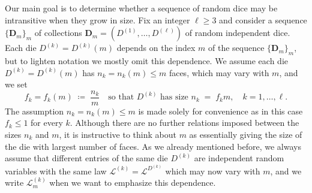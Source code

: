 \documentclass[reqno,a4paper,11pt]{amsart}
\theoremstyle{remark}
\newcommand{\mc}[1]{{\mathcal #1}}
\newcommand{\mb}[1]{{\mathbf #1}}
\numberwithin{equation}{section}
\begin{document}
Our main goal is to determine whether a sequence of random dice may be intransitive when they grow in size. Fix an integer $\ell\geq 3$ and consider a sequence $\{\mb D_m\}_m$ of collections $\mb D_m=(D^{(1)},\hdots, D^{(\ell)})$ of random independent dice. Each die $D^{(k)}=D^{(k)}(m)$ depends on the index $m$ of the sequence $\{\mb D_m\}_m$, but to lighten notation we mostly omit this dependence. We assume each die $D^{(k)}=D^{(k)}(m)$ has $n_k=n_k(m)\leq m$ faces, which may vary with $m$, and we set
%
\begin{equation}\label{deff:fkm}
f_k=f_k(m)\;\coloneqq\;\frac{n_k}{m}\quad \text{so that } D^{(k)} \text{ has size } n_k\;=\;f_km,\quad k=1,\hdots, \ell.
\end{equation}
%
The assumption $n_k=n_k(m)\leq m$ is made solely for convenience as in this case $f_k\leq 1$ for every $k$. Although there are no further relations imposed between the sizes $n_k$ and $m$, it is instructive to think about $m$ as essentially giving the size of the die with largest number of faces.  As we already mentioned before, we always assume that different entries of the same die $D^{(k)}$ are independent random variables with the same law $\mc L^{(k)}=\mc L^{D^{(k)}}$ which may now vary with $m$, and we write $\mc L^{(k)}_m$ when we want to emphasize this dependence.
\end{document}
